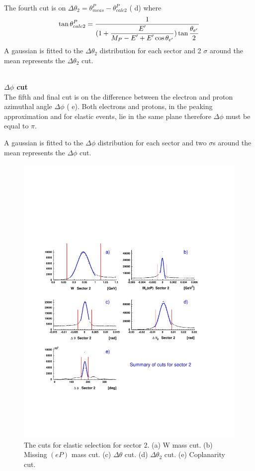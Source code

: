The fourth cut is on $\Delta\theta_2 = \theta^P_{meas} - \theta^P_{calc2}$ ( d) where
$$
 \tan\theta^P_{calc2} =  \frac{\displaystyle 1}{\displaystyle (1+\frac{\displaystyle E'}{\displaystyle M_P-E'+E'\cos\theta_{e'}})\tan\frac{\displaystyle \theta_{e'}}{\displaystyle 2}}
$$
A gaussian is fitted to the $\Delta\theta_2$ distribution for each sector and 2 $\sigma$ around the mean
represents the $\Delta\theta_2$ cut.

\hfill\\

{\bf\boldmath$\Delta\phi$ cut} \\
The fifth and final cut is on the difference between the electron and proton 
azimuthal angle  $\Delta\phi$ ( e).
Both electrons and protons, in the peaking approximation and for elastic events,  
lie in the same plane therefore $\Delta\phi$ must be equal to $\pi$.

A gaussian is fitted to the $\Delta\phi$ distribution for each sector and two $\sigma$s around the mean
represents the $\Delta\phi$ cut.


\begin{figure}[h]
 \begin{center}
 \includegraphics[width = 12cm, bb=60 130 540 590]{data_reduction/kine_corr/img/elastic_cuts_s2} 
  \caption[The cuts for elastic selection for sector 2]
          { The cuts for elastic selection for sector 2. (a) W mass cut. (b) Missing $(eP)$ mass cut.
	             (c) $\Delta\theta$ cut. (d) $\Delta\theta_2$ cut. (e) Coplanarity cut. }
 \label{fig:elastic_cuts_s2}
 \end{center}
\end{figure}






